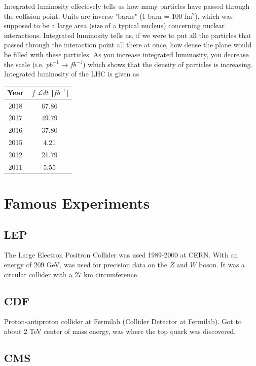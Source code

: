 Integrated luminosity effectively tells us how many particles have passed through the collision point.  Units are inverse "barns" (1 barn = 100 fm$^2$), which was supposed to be a large area (size of a typical nucleus) concerning nuclear interactions. Integrated luminosity tells us, if we were to put all the particles that passed through the interaction point all there at once, how dense the plane would be filled with these particles. As you increase integrated luminosity, you decrease the scale (i.e. $pb^{-1} \rightarrow fb^{-1}$) which shows that the density of particles is increasing. Integrated luminosity of the LHC is given as

\begin{center}
\begin{tabular}{ | c | c|} 
\hline
 Year & $\int \mathcal{L} dt$ [$fb^{-1}$] \\ \hline
 2018 & 67.86  \\ 
 2017 & 49.79  \\
2016 & 37.80   \\ 
2015 & 4.21 \\
2012 & 21.79 \\
2011 & 5.55\\
\hline
\end{tabular}
\end{center}

\section{Famous Experiments}

\subsection{LEP}\label{lep}
The Large Electron Positron Collider was used 1989-2000 at CERN. With an energy of 209 GeV, was used for precision data on the $Z$ and $W$ boson. It was a circular collider with a 27 km circumference.
\subsection{CDF}
Proton-antiproton collider at Fermilab (Collider Detector at Fermilab). Got to about $2$ TeV center of mass energy, was where the top quark was discovered.

\subsection{CMS}


